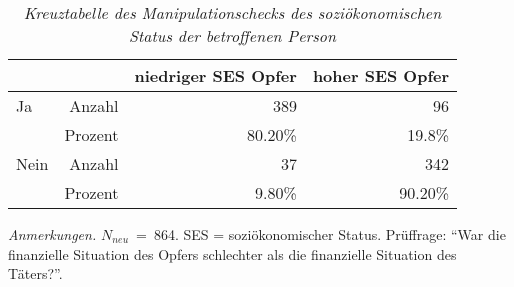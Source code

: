 \begin{table}[htb]
    \caption[Kreuztabelle Manipulationscheck soziökonomischer Status des Opfers]{\textit {Kreuztabelle des Manipulationschecks des soziökonomischen Status der betroffenen Person}} 
    \label{KT_SES}
    \centering
    \begin{adjustbox}{width=10cm} %
    \small
    \begin{tabular}{lrrr}
      \hline
        &   & niedriger SES Opfer & hoher SES Opfer \\
      \hline
    Ja   & Anzahl  & 389      & 96      \\
         & Prozent & 80.20\%  & 19.8\%  \\
    Nein & Anzahl  & 37       & 342     \\
         & Prozent & 9.80\%   & 90.20\% \\
       \hline
    \end{tabular}
    \end{adjustbox}
    
    \begin{tablenotes}
        \item \textit{Anmerkungen.} \( N_{neu} \)~=~864. SES = soziökonomischer Status. Prüffrage: \enquote{War die finanzielle Situation des Opfers schlechter als die finanzielle Situation des Täters?}.
      \end{tablenotes}
    \end{table}